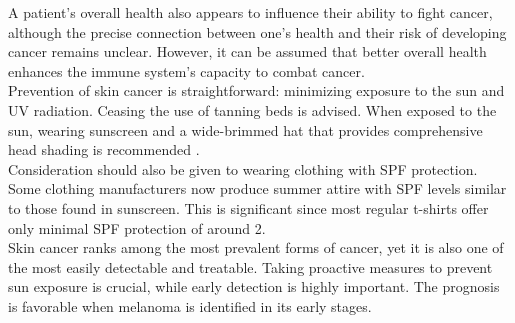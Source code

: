 A patient's overall health also appears to influence their ability to fight cancer, although the precise connection between one's health and their risk of developing cancer remains unclear. However, it can be assumed that better overall health enhances the immune system's capacity to combat cancer. \\

Prevention of skin cancer is straightforward: minimizing exposure to the sun and UV radiation. Ceasing the use of tanning beds is advised. When exposed to the sun, wearing sunscreen and a wide-brimmed hat that provides comprehensive head shading is recommended \cite{OrigenAndTreatment}. \\

Consideration should also be given to wearing clothing with SPF protection. Some clothing manufacturers now produce summer attire with SPF levels similar to those found in sunscreen. This is significant since most regular t-shirts offer only minimal SPF protection of around 2. \\

Skin cancer ranks among the most prevalent forms of cancer, yet it is also one of the most easily detectable and treatable. Taking proactive measures to prevent sun exposure is crucial, while early detection is highly important. The prognosis is favorable when melanoma is identified in its early stages.


